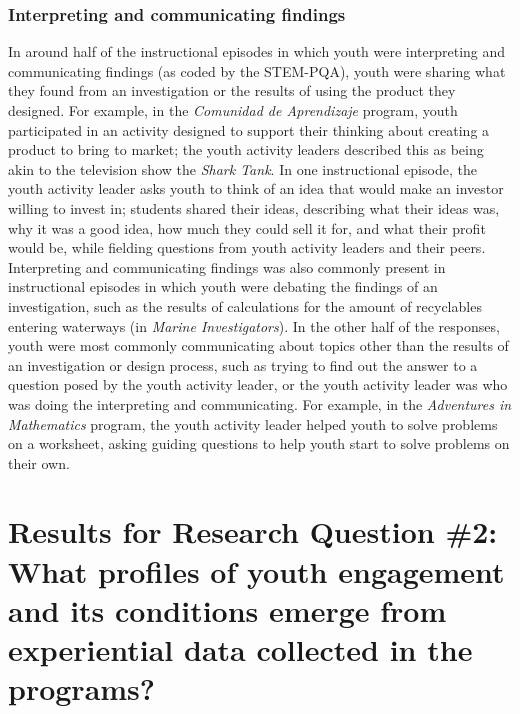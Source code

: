 \documentclass[]{book}
\theoremstyle{definition}
\theoremstyle{definition}
\theoremstyle{definition}
\theoremstyle{remark}
\begin{document}
\subsubsection{Interpreting and communicating
findings}\label{interpreting-and-communicating-findings}

In around half of the instructional episodes in which youth were
interpreting and communicating findings (as coded by the STEM-PQA),
youth were sharing what they found from an investigation or the results
of using the product they designed. For example, in the \emph{Comunidad
de Aprendizaje} program, youth participated in an activity designed to
support their thinking about creating a product to bring to market; the
youth activity leaders described this as being akin to the television
show the \emph{Shark Tank}. In one instructional episode, the youth
activity leader asks youth to think of an idea that would make an
investor willing to invest in; students shared their ideas, describing
what their ideas was, why it was a good idea, how much they could sell
it for, and what their profit would be, while fielding questions from
youth activity leaders and their peers. Interpreting and communicating
findings was also commonly present in instructional episodes in which
youth were debating the findings of an investigation, such as the
results of calculations for the amount of recyclables entering waterways
(in \emph{Marine Investigators}). In the other half of the responses,
youth were most commonly communicating about topics other than the
results of an investigation or design process, such as trying to find
out the answer to a question posed by the youth activity leader, or the
youth activity leader was who was doing the interpreting and
communicating. For example, in the \emph{Adventures in Mathematics}
program, the youth activity leader helped youth to solve problems on a
worksheet, asking guiding questions to help youth start to solve
problems on their own.

\section{Results for Research Question \#2: What profiles of youth
engagement and its conditions emerge from experiential data collected in
the
programs?}\label{results-for-research-question-2-what-profiles-of-youth-engagement-and-its-conditions-emerge-from-experiential-data-collected-in-the-programs}
\end{document}
